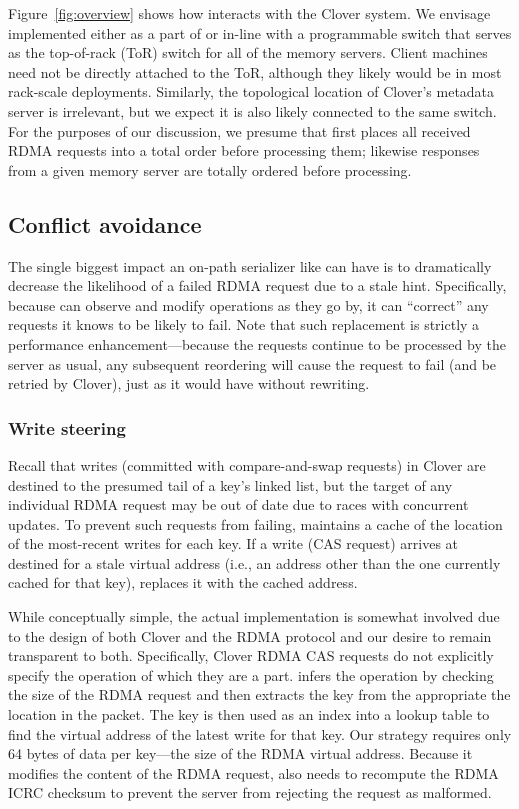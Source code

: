 Figure~\ref{fig:overview} shows how {\sword} interacts with the Clover
system.  We envisage {\sword} implemented either as a part of or in-line with
a programmable switch that serves as the top-of-rack (ToR) switch
for all of the memory servers.  Client machines need not be directly
attached to the ToR, although they likely would be in most rack-scale
deployments.  Similarly, the topological location of Clover's metadata
server is irrelevant, but we expect it is also likely connected to the
same switch.  For the purposes of our discussion, we presume that
{\sword} first places all received RDMA requests into a total order
before processing them; likewise responses from a given memory
server are totally ordered before processing.

\subsection{Conflict avoidance}

The single biggest impact an on-path serializer like {\sword} can have
is to dramatically decrease the likelihood of a failed RDMA request due
to a stale hint.  Specifically, because {\sword} can observe and
modify operations as they go by, it can ``correct'' any requests it
knows to be likely to fail.  Note that such replacement is strictly a
performance enhancement---because the requests continue to be
processed by the server as usual, any subsequent reordering will
cause the request to fail (and be retried by Clover), just as
it would have without rewriting.

\subsubsection{Write steering}

Recall that writes (committed with compare-and-swap requests) in
Clover are destined to the presumed tail of a key's linked list, but
the target of any individual RDMA request may be out of date due to
races with concurrent updates.  To prevent such requests from
failing, {\sword} maintains a cache of the location of the most-recent writes
for each key. If a write (CAS request) arrives at {\sword}
destined for a stale virtual address (i.e., an address other than the
one currently cached for that key), {\sword} replaces it with
the cached address.

While conceptually simple, the actual implementation is somewhat
involved due to the design of both Clover and the RDMA protocol and
our desire to remain transparent to both.  Specifically, Clover RDMA
CAS requests do not explicitly specify the operation of which they are
a part.  {\sword} infers the operation by checking the size of the
RDMA request and then extracts the key from the appropriate the
location in the packet.  The key is then used as an index into a
lookup table to find the virtual address of the latest write for that
key.  Our strategy requires only 64 bytes of data per key---the size
of the RDMA virtual address.  Because it modifies the content of the
RDMA request, {\sword} also needs to recompute the RDMA ICRC checksum
to prevent the server from rejecting the request as malformed.

